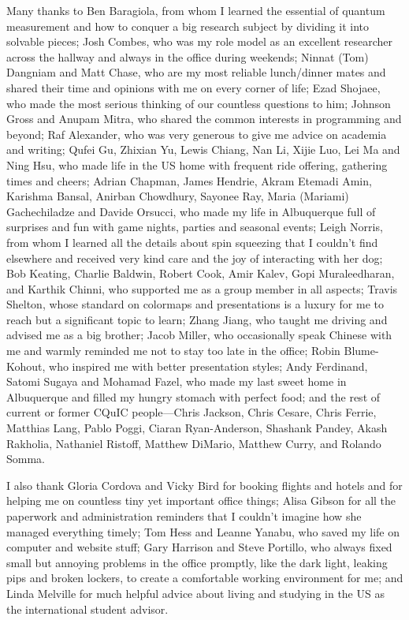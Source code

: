 \begin{acknowledgments}
Many thanks to Ben Baragiola, from whom I learned the essential of quantum measurement and how to conquer a big research subject by dividing it into solvable pieces; Josh Combes, who was my role model as an excellent researcher across the hallway and always in the office during weekends; Ninnat (Tom) Dangniam and Matt Chase, who are my most reliable lunch/dinner mates and shared their time and opinions with me on every corner of life; Ezad Shojaee, who made the most serious thinking of our countless questions to him; Johnson Gross and Anupam Mitra, who shared the common interests in programming and beyond; Raf Alexander, who was very generous to give me advice on academia and writing; Qufei Gu, Zhixian Yu, Lewis Chiang, Nan Li, Xijie Luo, Lei Ma and Ning Hsu, who made life in the US home with frequent ride offering, gathering times and cheers; Adrian Chapman, James Hendrie, Akram Etemadi Amin, Karishma Bansal, Anirban Chowdhury, Sayonee Ray, Maria (Mariami) Gachechiladze and Davide Orsucci, who made my life in Albuquerque full of surprises and fun with game nights, parties and seasonal events; Leigh Norris, from whom I learned all the details about spin squeezing that I couldn't find elsewhere and received very kind care and the joy of interacting with her dog; Bob Keating, Charlie Baldwin, Robert Cook, Amir Kalev, Gopi Muraleedharan, and Karthik Chinni, who supported me as a group member in all aspects; Travis Shelton, whose standard on colormaps and presentations is a luxury for me to reach but a significant topic to learn; Zhang Jiang, who taught me driving and advised me as a big brother; Jacob Miller, who occasionally speak Chinese with me and warmly reminded me not to stay too late in the office; Robin Blume-Kohout, who inspired me with better presentation styles; Andy Ferdinand, Satomi Sugaya and Mohamad Fazel, who made my last sweet home in Albuquerque and filled my hungry stomach with perfect food; and the rest of current or former CQuIC people---Chris Jackson, Chris Cesare, Chris Ferrie, Matthias Lang, Pablo Poggi, Ciaran Ryan-Anderson, Shashank Pandey, Akash Rakholia, Nathaniel Ristoff, Matthew DiMario, Matthew Curry, and Rolando Somma.

I also thank Gloria Cordova and Vicky Bird for booking flights and hotels and for helping me on countless tiny yet important office things; Alisa Gibson for all the paperwork and administration reminders that I couldn't imagine how she managed everything timely; Tom Hess and Leanne Yanabu, who saved my life on computer and website stuff; Gary Harrison and Steve Portillo, who always fixed small but annoying problems in the office promptly, like the dark light, leaking pips and broken lockers, to create a comfortable working environment for me; and Linda Melville for much helpful advice about living and studying in the \hbox{US} as the international student advisor.


\end{acknowledgments}
